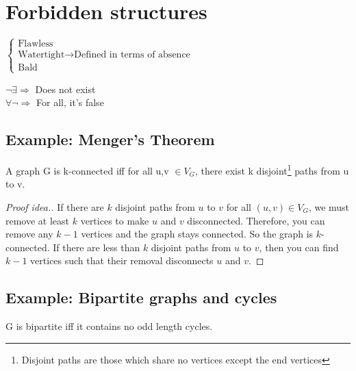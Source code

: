 \documentclass{article}
\begin{document}

\section{Forbidden structures}

$
\begin{cases}
    \text{Flawless}\\
    \text{Watertight}  \longrightarrow  \text{Defined in terms of absence}\\
    \text{Bald}
\end{cases}
$

$\neg\exists \Longrightarrow $ Does not exist\\
$\forall\neg \Longrightarrow $ For all, it's false

\subsection{Example: Menger's Theorem}
\begin{theorem}
    A graph G is k-connected iff for all u,v $\in V_{G}$, there exist k disjoint\footnote{\label{disjoint}Disjoint paths are those which share no vertices except the end vertices} paths from u to v.
\end{theorem}

\begin{proof}[Proof idea.]\let\qed\relax
    If there are $k$ disjoint paths from $u$ to $v$ for all $(u,v) \in V_{G}$, we must remove at least $k$ vertices to make $u$ and $v$ disconnected. Therefore, you can remove any $k-1$ vertices and the graph stays connected. So the graph is $k$-connected. If there are less than $k$ disjoint paths from $u$ to $v$, then you can find $k-1$ vertices such that their removal disconnects $u$ and $v$.
\end{proof}

\subsection{Example: Bipartite graphs and cycles}
\begin{theorem}
    \label{thm:bipartiteNoOddCycle}
    G is bipartite iff it contains no odd length cycles.
\end{theorem}
\end{document}

